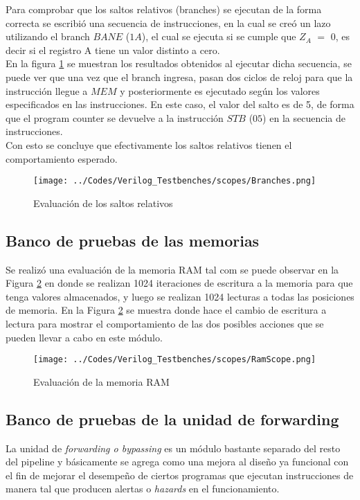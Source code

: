 Para comprobar que los saltos relativos (branches) se ejecutan de la forma correcta se escribi\'o una secuencia de instrucciones, en la cual se cre\'o un lazo utilizando el branch $BANE$ ($1A$), el cual se ejecuta si se cumple que $Z_{A}$ $=$ $0$, es decir si el registro A tiene un valor distinto a cero.\\

En la figura \ref{f:branches_scope} se muestran los resultados obtenidos al ejecutar dicha secuencia, se puede ver que una vez que el branch ingresa, pasan dos ciclos de reloj para que la instrucci\'on llegue a $MEM$ y posteriormente es ejecutado seg\'un los valores especificados en las instrucciones. En este caso, el valor del salto es de 5, de forma que el program counter se devuelve a la instrucci\'on $STB$ ($05$) en la secuencia de instrucciones.\\

Con esto se concluye que efectivamente los saltos relativos tienen el comportamiento esperado.\\

\begin{figure}[hbtp]
\caption{Evaluaci\'on de los saltos relativos}
\centering
\texttt{[image: ../Codes/Verilog\_Testbenches/scopes/Branches.png]}
\label{f:branches_scope}
\end{figure}



\subsection{Banco de pruebas de las memorias}
Se realiz\' o una evaluaci\' on de la memoria RAM tal com se puede observar en la Figura \ref{fig:RAMmem} en donde se realizan 1024 iteraciones de escritura a la memoria para que tenga valores almacenados, y luego se realizan 1024 lecturas a todas las posiciones de memoria. En la Figura \ref{fig:RAMmem} se muestra donde hace el cambio de escritura a lectura para mostrar el comportamiento de las dos posibles acciones que se pueden llevar a cabo en este m\' odulo.

\begin{figure}[hbtp]
\caption{Evaluaci\' on de la memoria RAM}
\centering
\texttt{[image: ../Codes/Verilog\_Testbenches/scopes/RamScope.png]}
\label{fig:RAMmem}
\end{figure}



\subsection{Banco de pruebas de la unidad de forwarding}
La unidad de \textit{forwarding o bypassing} es un m\' odulo bastante separado del resto del pipeline y b\' asicamente se agrega como una mejora al dise\~ no ya funcional con el fin de mejorar el desempe\~ no de ciertos programas que ejecutan instrucciones de manera tal que producen alertas o \textit{hazards} en el funcionamiento.

